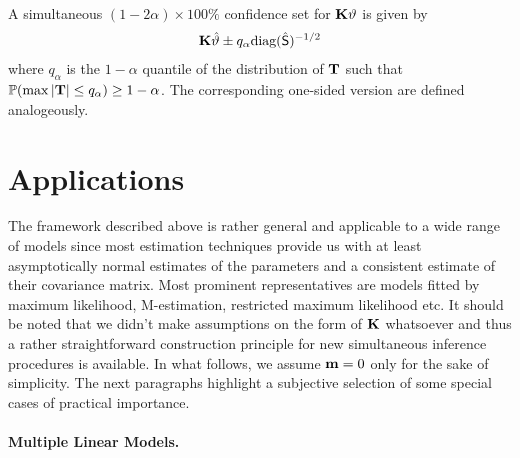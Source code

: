 \documentclass[12pt]{article}
\begin{document}
A simultaneous $(1 - 2\alpha) \times 100\%$ 
confidence set for $\mathbf{K} \vartheta$ is given by
\begin{eqnarray*} 
\mathbf{K} \hat{\vartheta} \pm q_\alpha \text{diag}(\hat{\textsf{S}})^{-1/2}
\end{eqnarray*}
where $q_\alpha$ is the $1 - \alpha$ 
quantile of the distribution of $\mathbf{T}$ 
such that $\mathbb{P}(\max{|\mathbf{T}|} \le q_\alpha) \ge 1 - \alpha$. The corresponding
one-sided version are defined analogeously.

\section{Applications} \label{applications}

The framework described above is rather general and applicable 
to a wide range of models since most estimation techniques provide us with 
at least asymptotically normal estimates of the parameters 
and a consistent estimate of their covariance matrix. Most prominent
representatives are models fitted by maximum likelihood, M-estimation,
restricted maximum likelihood etc. 
It should be noted that we didn't make assumptions on the form
of $\mathbf{K}$ whatsoever and thus a rather straightforward construction 
principle for new simultaneous inference procedures is available. In
what follows, we assume $\mathbf{m} = 0$ only for the sake of simplicity.
The next paragraphs highlight a subjective selection of 
some special cases of practical importance.

\paragraph{Multiple Linear Models.}
\end{document}
